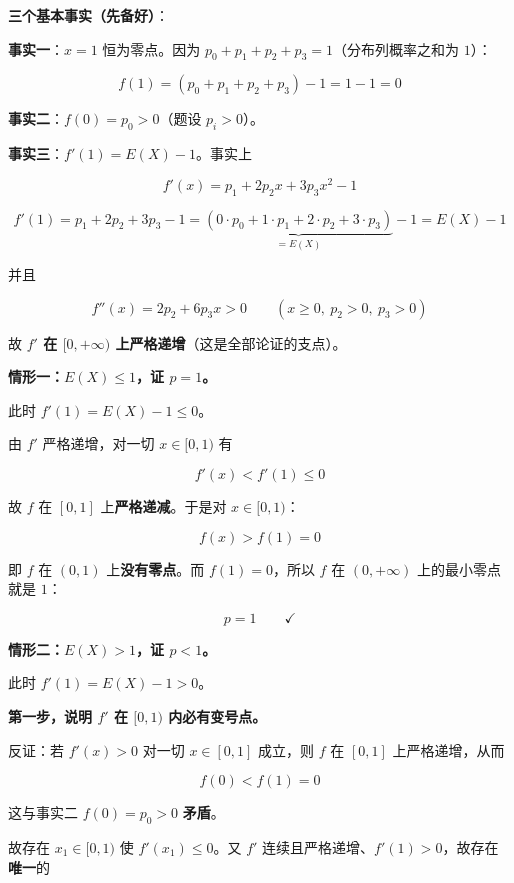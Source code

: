 \begin{answer}
\textbf{三个基本事实（先备好）}：

\textbf{事实一}：$x=1$ 恒为零点。因为 $p_0+p_1+p_2+p_3=1$（分布列概率之和为 $1$）：

\nopagebreak[4]
\[f(1)=\left(p_0+p_1+p_2+p_3\right)-1=1-1=0\]

\textbf{事实二}：$f(0)=p_0>0$（题设 $p_i>0$）。

\textbf{事实三}：$f'(1)=E(X)-1$。事实上

\nopagebreak[4]
\[f'(x)=p_1+2p_2x+3p_3x^{2}-1\]

\nopagebreak[4]
\[f'(1)=p_1+2p_2+3p_3-1=\underbrace{\left(0\cdot p_0+1\cdot p_1+2\cdot p_2+3\cdot p_3\right)}_{=E(X)}-1=E(X)-1\]

并且

\nopagebreak[4]
\[f''(x)=2p_2+6p_3x>0\qquad(x\ge0,\ p_2>0,\ p_3>0)\]

故 \textbf{$f'$ 在 $[0,+\infty)$ 上严格递增}（这是全部论证的支点）。

\par\medskip

\textbf{情形一：$E(X)\le1$，证 $p=1$。}

此时 $f'(1)=E(X)-1\le0$。

由 $f'$ 严格递增，对一切 $x\in[0,1)$ 有

\nopagebreak[4]
\[f'(x)<f'(1)\le0\]

故 $f$ 在 $[0,1]$ 上\textbf{严格递减}。于是对 $x\in[0,1)$：

\nopagebreak[4]
\[f(x)>f(1)=0\]

即 $f$ 在 $(0,1)$ 上\textbf{没有零点}。而 $f(1)=0$，所以 $f$ 在 $(0,+\infty)$ 上的最小零点就是 $1$：

\nopagebreak[4]
\[p=1\qquad\checkmark\]

\par\medskip

\textbf{情形二：$E(X)>1$，证 $p<1$。}

此时 $f'(1)=E(X)-1>0$。

\textbf{第一步，说明 $f'$ 在 $[0,1)$ 内必有变号点。}

反证：若 $f'(x)>0$ 对一切 $x\in[0,1]$ 成立，则 $f$ 在 $[0,1]$ 上严格递增，从而

\nopagebreak[4]
\[f(0)<f(1)=0\]

这与事实二 $f(0)=p_0>0$ \textbf{矛盾}。

故存在 $x_1\in[0,1)$ 使 $f'\left(x_1\right)\le0$。又 $f'$ 连续且严格递增、$f'(1)>0$，故存在\textbf{唯一}的


\end{answer}
